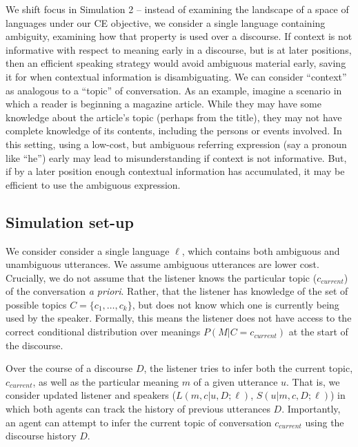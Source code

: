 \documentclass[10pt, letterpaper]{article}
\begin{document}
We shift focus in Simulation 2 -- instead of examining the landscape of
a space of languages under our CE objective, we consider a single
language containing ambiguity, examining how that property is used over
a discourse. If context is not informative with respect to meaning early
in a discourse, but is at later positions, then an efficient speaking
strategy would avoid ambiguous material early, saving it for when
contextual information is disambiguating. We can consider ``context'' as
analogous to a ``topic'' of conversation. As an example, imagine a
scenario in which a reader is beginning a magazine article. While they
may have some knowledge about the article's topic (perhaps from the
title), they may not have complete knowledge of its contents, including
the persons or events involved. In this setting, using a low-cost, but
ambiguous referring expression (say a pronoun like ``he'') early may
lead to misunderstanding if context is not informative. But, if by a
later position enough contextual information has accumulated, it may be
efficient to use the ambiguous expression.\par

\subsection{Simulation set-up}\label{simulation-set-up-1}

We consider consider a single language \(\ell\), which contains both
ambiguous and unambiguous utterances. We assume ambiguous utterances are
lower cost. Crucially, we do not assume that the listener knows the
particular topic (\(c_{current}\)) of the conversation
\textit{a priori}. Rather, that the listener has knowledge of the set of
possible topics \(C = \{c_1, \dots, c_k\}\), but does not know which one
is currently being used by the speaker. Formally, this means the
listener does not have access to the correct conditional distribution
over meanings \(P(M|C=c_{current})\) at the start of the discourse.\par 

Over the course of a discourse \(D\), the listener tries to infer both
the current topic, \(c_{current}\), as well as the particular meaning
\(m\) of a given utterance \(u\). That is, we consider updated listener
and speakers (\(L(m, c|u,D;\ell)\), \(S(u|m,c,D;\ell)\)) in which both
agents can track the history of previous utterances \(D\). Importantly,
an agent can attempt to infer the current topic of conversation
\(c_{current}\) using the discourse history \(D\).\par
\end{document}
